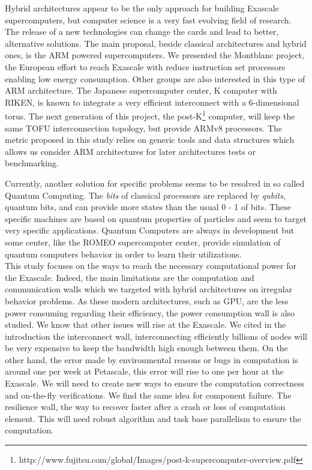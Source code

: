 Hybrid architectures appear to be the only approach for building Exascale supercomputers, but computer science is a very fast evolving field of research.  
The release of a new technologies can change the cards and lead to better, alternative solutions.
The main proposal, beside classical architectures and hybrid ones, is the ARM powered supercomputers. 
We presented the Montblanc project, the European effort to reach Exascale with reduce instruction set processors enabling low energy consumption. 
Other groups are also interested in this type of ARM architecture. 
The Japanese supercomputer center, K computer with RIKEN, is known to integrate a very efficient interconnect with a 6-dimensional torus.
The next generation of this project, the post-K\footnote{http://www.fujitsu.com/global/Images/post-k-supercomputer-overview.pdf} computer, will keep the same TOFU interconnection topology, but provide ARMv8 processors. 
The metric proposed in this study relies on generic tools and data structures which allows us consider ARM architectures for later architectures tests or benchmarking.

Currently, another solution for specific problems seems to be resolved in so called Quantum Computing.
The \textit{bits} of classical processors are replaced by \textit{qubits}, quantum bits, and can provide more states than the usual 0 - 1 of bits.
These specific machines are based on quantum properties of particles and seem to target very specific applications. 
Quantum Computers are always in development but some center, like the ROMEO supercomputer center, provide simulation of quantum computers behavior in order to learn their utilizations.\\

This study focuses on the ways to reach the necessary computational power for the Exascale. 
Indeed, the main limitations are the computation and communication walls which we targeted with hybrid architectures on irregular behavior problems. 
As these modern architectures, such as GPU, are the less power consuming regarding their efficiency, the power consumption wall is also studied. 
We know that other issues will rise at the Exascale. 
We cited in the introduction the interconnect wall, interconnecting efficiently billions of nodes will be very expensive to keep the bandwidth high enough between them.
On the other hand, the error made by environmental reasons or bugs in computation is around one per week at Petascale, this error will rise to one per hour at the Exascale. 
We will need to create new ways to ensure the computation correctness and on-the-fly verifications.
We find the same idea for component failure.
The resilience wall, the way to recover faster after a crash or loss of computation element.
This will need robust algorithm and task base parallelism to ensure the computation.

